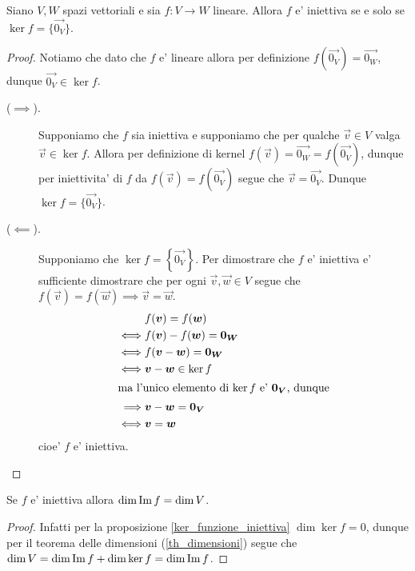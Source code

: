 \begin{proposition}\label{ker_funzione_iniettiva}
    Siano $V, W$ spazi vettoriali e sia $f : V \to W$ lineare. Allora $f$ e' iniettiva se e solo se $\ker f = \{\vec{0_V}\}$. 
\end{proposition}
\begin{proof}
    Notiamo che dato che $f$ e' lineare allora per definizione $f(\vec{0_V}) = \vec{0_W}$, dunque $\vec{0_V} \in \ker f$.
    \begin{description}
        \item [($\implies$).] Supponiamo che $f$ sia iniettiva e supponiamo che per qualche $\vec{v} \in V$ valga $\vec{v} \in \ker f$. Allora per definizione di kernel $f(\vec{v}) = \vec{0_W} = f(\vec{0_V})$, dunque per iniettivita' di $f$ da $f(\vec{v}) = f(\vec{0_V})$ segue che $\vec v = \vec{0_V}$. Dunque $\ker f = \{\vec{0_V}\}$.
        \item [($\impliedby$).] Supponiamo che $\ker f = \left\{ \vec{0_V}\right\}$. Per dimostrare che $f$ e' iniettiva e' sufficiente dimostrare che per ogni $\vec{v}, \vec{w} \in V$ segue che $f(\vec{v}) = f(\vec{w}) \implies \vec{v} = \vec{w}$.
        \begin{alignat*}{1}
            &f(\vec{v}) = f(\vec{w}) \\
            \iff &f(\vec{v}) - f(\vec{w}) = \vec{0_W} \\
            \iff &f(\vec{v} - \vec{w}) = \vec{0_W} \\
            \iff &\vec{v} - \vec{w} \in \ker f \\
            \intertext{ma l'unico elemento di $\ker f$ e' $\vec{0_V}$, dunque}
            \implies &\vec{v} - \vec{w} = \vec{0_V}\\
            \iff &\vec{v} = \vec{w}
        \end{alignat*}
        cioe' $f$ e' iniettiva. \qedhere
    \end{description}
\end{proof}

\begin{corollary}\label{iniettiva_allora_dimIm_uguale_dimV}
    Se $f$ e' iniettiva allora $\dim \Imm{f} = \dim V$.
\end{corollary}
\begin{proof}
    Infatti per la proposizione \ref{ker_funzione_iniettiva} $\dim \ker f = 0$, dunque per il teorema delle dimensioni (\ref{th_dimensioni}) segue che $\dim V = \dim \Imm{f} + \dim \ker f = \dim \Imm{f}$.
\end{proof}

